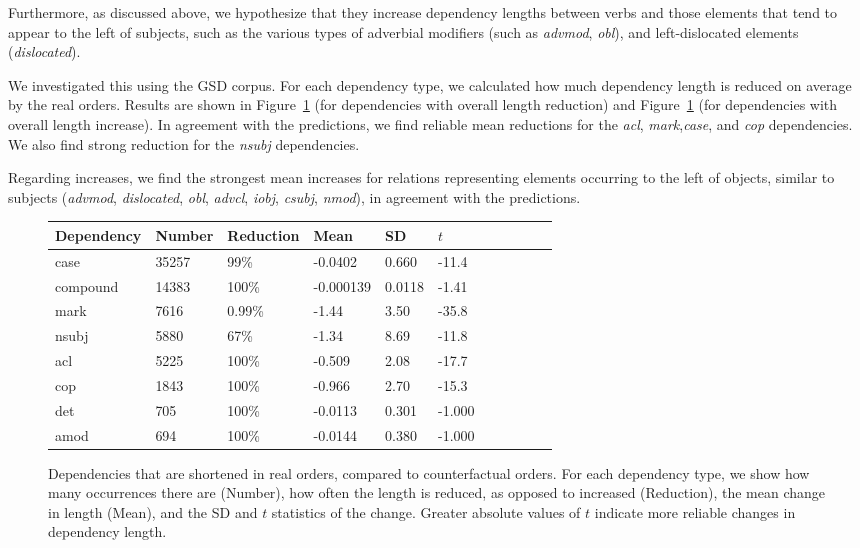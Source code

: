 \documentclass[11pt,a4paper]{article}
\begin{document}
Furthermore, as discussed above, we hypothesize that they increase dependency lengths between verbs and those elements that tend to appear to the left of subjects, such as the various types of adverbial modifiers (such as \textit{advmod}, \textit{obl}), and left-dislocated elements (\textit{dislocated}).

We investigated this using the GSD corpus.
For each dependency type, we calculated how much dependency length is reduced on average by the real orders.
Results are shown in Figure~\ref{fig:shortened} (for dependencies with overall length reduction) and Figure~\ref{fig:shortened} (for dependencies with overall length increase).
In agreement with the predictions, we find reliable mean reductions for the \emph{acl}, \emph{mark},\emph{case}, and \emph{cop} dependencies.
We also find strong reduction for the \emph{nsubj} dependencies.


Regarding increases, we find the strongest mean increases for relations representing elements occurring to the left of objects, similar to subjects (\emph{advmod}, \emph{dislocated}, \emph{obl}, \emph{advcl}, \emph{iobj}, \emph{csubj}, \emph{nmod}), in agreement with the predictions.

\begin{figure}
\begin{center}
\begin{tabular}{l|llllllllll}
   Dependency  &Number &Reduction     &  Mean   &   SD &       $t$ \\ \hline
  case & 35257  &  99\% & -0.0402     &0.660  & -11.4   \\
 compound     &14383  &  100\%     & -0.000139   &0.0118 &  -1.41  \\ 
 mark  & 7616  &  0.99\% & -1.44       &3.50 &   -35.8   \\
  nsubj        & 5880  &  67\% & -1.34       &8.69  &  -11.8   \\
  acl          & 5225  &  100\%     & -0.509      &2.08  &  -17.7   \\
 cop   & 1843  &  100\%    &  -0.966      &2.70  &  -15.3   \\
 det          &  705  &  100\%    &  -0.0113     &0.301 &   -1.000 \\
 amod         &  694  &  100\%    &  -0.0144     &0.380 &   -1.000 \\
\end{tabular}
\end{center}
\caption{Dependencies that are shortened in real orders, compared to counterfactual orders. For each dependency type, we show how many occurrences there are (Number), how often the length is reduced, as opposed to increased (Reduction), the mean change in length (Mean), and the SD and $t$ statistics of the change. Greater absolute values of $t$ indicate more reliable changes in dependency length.}\label{fig:shortened}
\end{figure}
\end{document}
